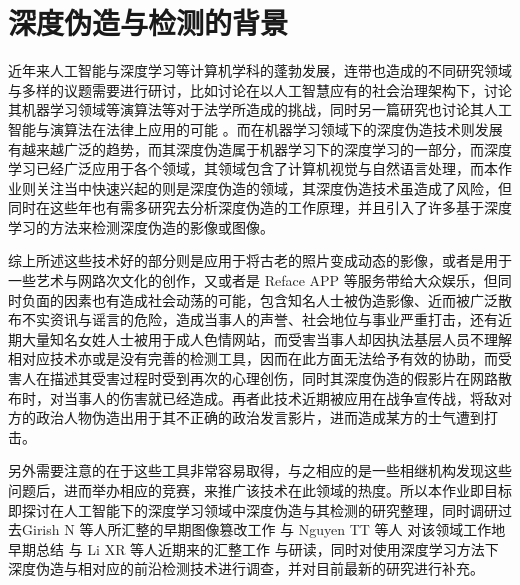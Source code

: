 \chapter{深度伪造与检测的背景}
\label{chap:1}
近年来人工智能与深度学习等计算机学科的蓬勃发展，连带也造成的不同研究领域与多样的议题需要进行研讨，比如讨论在以人工智慧应有的社会治理架构下，讨论其机器学习领域等演算法等对于法学所造成的挑战\cite{law01}，同时另一篇研究也讨论其人工智能与演算法在法律上应用的可能 \cite{law03}。而在机器学习领域下的深度伪造技术则发展有越来越广泛的趋势，而其深度伪造属于机器学习下的深度学习的一部分，而深度学习已经广泛应用于各个领域，其领域包含了计算机视觉与自然语言处理，而本作业则关注当中快速兴起的则是深度伪造的领域，其深度伪造技术\cite{list1101}虽造成了风险，但同时在这些年也有需多研究去分析深度伪造的工作原理，并且引入了许多基于深度学习的方法来检测深度伪造的影像或图像。

综上所述这些技术好的部分则是应用于将古老的照片变成动态的影像，或者是用于一些艺术与网路次文化的创作，又或者是 Reface APP\cite{list1102} 等服务带给大众娱乐，但同时负面的因素也有造成社会动荡的可能，包含知名人士被伪造影像、近而被广泛散布不实资讯与谣言的危险，造成当事人的声誉、社会地位与事业严重打击，还有近期大量知名女姓人士被用于成人色情网站，而受害当事人却因执法基层人员不理解相对应技术亦或是没有完善的检测工具，因而在此方面无法给予有效的协助，而受害人在描述其受害过程时受到再次的心理创伤，同时其深度伪造的假影片在网路散布时，对当事人的伤害就已经造成。再者此技术近期被应用在战争宣传战，将敌对方的政治人物伪造出用于其不正确的政治发言影片，进而造成某方的士气遭到打击。


另外需要注意的在于这些工具非常容易取得，与之相应的是一些相继机构发现这些问题后，进而举办相应的竞赛\cite{list1103}，来推广该技术在此领域的热度。所以本作业即目标即探讨在人工智能下的深度学习领域中深度伪造与其检测的研究整理，同时调研过去Girish N 等人所汇整的早期图像篡改工作 \cite{girish2019review}与 Nguyen TT 等人 对该领域工作地早期总结 \cite{nguyen2019deep}与 Li XR 等人近期来的汇整工作\cite{2021496} 与研读，同时对使用深度学习方法下深度伪造与相对应的前沿检测技术进行调查，并对目前最新的研究进行补充。

